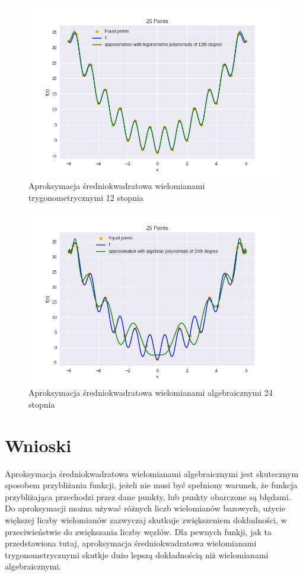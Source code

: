 \documentclass{article}
\begin{document}
\begin{figure}[H]
    \centering
    \includegraphics[width=\textwidth]{img/tripoly_12_25.png}
    \caption{Aproksymacja średniokwadratowa wielomianami trygonometrycznymi 12 stopnia}
\end{figure}

\begin{figure}[H]
    \centering
    \includegraphics[width=\textwidth]{img/algpoly_24_25.png}
    \caption{Aproksymacja średniokwadratowa wielomianami algebraicznymi 24 stopnia}
\end{figure}

\section{Wnioski}
Aproksymacja średniokwadratowa wielomianami algebraicznymi jest skutecznym sposobem przybliżania funkcji, jeżeli nie musi być spełniony
warunek, że funkcja przybliżająca przechodzi przez dane punkty, lub punkty obarczone są błędami. Do aproksymacji można używać różnych liczb
wielomianów bazowych, użycie większej liczby wielomianów zazwyczaj skutkuje zwiększeniem dokładności, w przeciwieństwie
do zwiększania liczby węzłów. Dla pewnych funkji, jak ta przedstawiona tutaj, aproksymacja średniokwadratowa wielomianami 
trygonometrycznymi skutkje dużo lepszą dokładnością niż wielomianami algebraicznymi.
\end{document}
